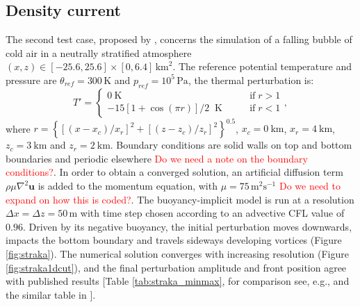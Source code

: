 \documentclass{ametsoc}
\theoremstyle{definition}
\newcommand{\benacchio}[1]{\textcolor{red}{#1}}
\begin{document}



\subsection{Density current}

The second test case, proposed by \cite{StrakaEtAl1993}, concerns the simulation of a falling bubble of cold air in a neutrally stratified atmosphere $(x,z)\in[-25.6,25.6]\times[0,6.4]\,\textrm{km}^2$. The reference potential temperature and pressure  are $\theta_{ref}=300\,\textrm{K}$ and $p_{ref}=10^5\,\textrm{Pa}$, the thermal perturbation is:
%
\begin{equation}
 T'=\begin{cases}
           0~\textrm{K} \qquad&\textrm{if}\;r>1\\
	   -15\left[1+\cos(\pi r)\right]/2 \;\;\textrm{K}\qquad&\textrm{if}\;r<1   
          \end{cases},
\end{equation} 
%
where $r=\left\{[(x-x_c)/x_r]^2+[(z-z_c)/z_r]^2\right\}^{0.5}$, $x_c=0~\textrm{km}$, $x_r=4~\textrm{km}$, $z_c=3~\textrm{km}$ and $z_r=2~\textrm{km}$. 
%
Boundary conditions are solid walls on top and bottom boundaries and periodic elsewhere \benacchio{Do we need a note on the boundary conditions?}. In order to obtain a converged solution, an artificial diffusion term $\rho\mu\nabla^2\mathbf{u}$ is added to the momentum equation, with $\mu=75\,\textrm{m$^2$s$^{-1}$}$ \benacchio{Do we need to expand on how this is coded?}. The buoyancy-implicit model is run at a resolution $\Delta x=\Delta z=50\,\textrm{m}$ with time step chosen according to an advective CFL value of $0.96$. Driven by its negative buoyancy, the initial perturbation moves downwards, impacts the bottom boundary and travels sideways developing vortices (Figure \ref{fig:straka}). The numerical solution converges with increasing resolution (Figure \ref{fig:straka1dcut}), and the final perturbation amplitude and front position agree with published results [Table \ref{tab:straka_minmax}, for comparison see, e.g., \cite{GiraldoRestelli2008} and the similar table in \cite{MelvinEtAl2018}].
\end{document}

